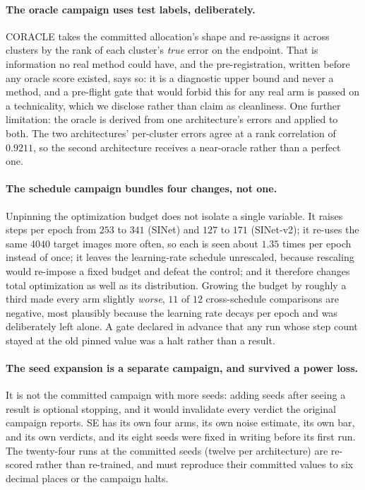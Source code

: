 \documentclass{article}
\newif\ifrevmarked \revmarkedtrue
\DeclareRobustCommand{\revB}[1]{\ifrevmarked{\color{RevB}#1}\else{#1}\fi}
\begin{document}
\paragraph{The oracle campaign uses test labels, deliberately.} CORACLE takes the committed
allocation's shape and re-assigns it across clusters by the rank of each cluster's \emph{true} error
on the endpoint. That is information no real method could have, and the pre-registration\revB{, written before any oracle
score existed,} says so: it is a diagnostic upper bound and never a method, and a pre-flight gate that
would forbid this for any real arm is passed on a technicality, which we disclose rather than claim
as cleanliness. One further limitation: the oracle is derived from one architecture's errors and
applied to both. The two architectures' per-cluster errors agree at a rank correlation of $0.9211$,
so the second architecture receives a near-oracle rather than a perfect one.

\paragraph{The schedule campaign bundles four changes, not one.} Unpinning the optimization budget
does not isolate a single variable. It raises steps per epoch from $253$ to $341$ (SINet) and $127$
to $171$ (SINet-v2); it re-uses the same $4040$ target images more often, so each is seen about
$1.35$ times per epoch instead of once; it leaves the learning-rate schedule unrescaled, because
rescaling would re-impose a fixed budget and defeat the control; and it therefore changes total
optimization as well as its distribution. Growing the budget by roughly a third made every arm
slightly \emph{worse}, $11$ of $12$ cross-schedule comparisons are negative, most plausibly
because the learning rate decays per epoch and was deliberately left alone. A gate declared in
advance that any run whose step count stayed at the old pinned value was a halt rather than a
result.

\paragraph{The seed expansion is a separate campaign, and survived a power loss.} It is not the
committed campaign with more seeds: adding seeds after seeing a result is optional stopping, and it
would invalidate every verdict the original campaign reports. SE has its own four arms, its own
noise estimate, its own bar, and its own verdicts, and its eight seeds were fixed in writing before
its first run. The twenty-four runs at the committed seeds (twelve per architecture) are re-scored rather than re-trained, and must
reproduce their committed values to six decimal places or the campaign halts.
\end{document}
